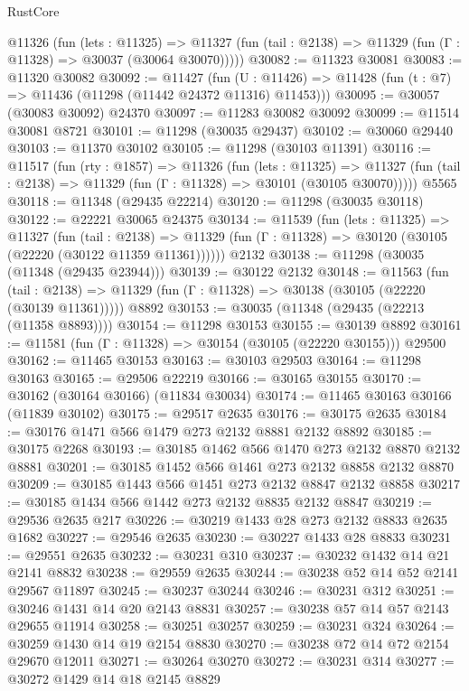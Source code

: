 \begin{lexlean}{RustCore}
\begin{coremodule}
    @11326
      (fun (lets : @11325) =>
      @11327 (fun (tail : @2138) => @11329 (fun (Γ : @11328) => @30037 (@30064 @30070)))))
@30082 := @11323 @30081
@30083 := @11320 @30082
@30092 := @11427
    (fun (U : @11426) => @11428 (fun (t : @7) => @11436 (@11298 (@11442 @24372 @11316) @11453)))
@30095 := @30057 (@30083 @30092) @24370
@30097 := @11283 @30082 @30092
@30099 := @11514 @30081 @8721
@30101 := @11298 (@30035 @29437)
@30102 := @30060 @29440
@30103 := @11370 @30102
@30105 := @11298 (@30103 @11391)
@30116 := @11517
    (fun (rty : @1857) =>
    @11326
      (fun (lets : @11325) =>
      @11327 (fun (tail : @2138) => @11329 (fun (Γ : @11328) => @30101 (@30105 @30070)))))
    @5565
@30118 := @11348 (@29435 @22214)
@30120 := @11298 (@30035 @30118)
@30122 := @22221 @30065 @24375
@30134 := @11539
    (fun (lets : @11325) =>
    @11327
      (fun (tail : @2138) =>
      @11329 (fun (Γ : @11328) => @30120 (@30105 (@22220 (@30122 @11359 @11361))))))
    @2132
@30138 := @11298 (@30035 (@11348 (@29435 @23944)))
@30139 := @30122 @2132
@30148 := @11563
    (fun (tail : @2138) => @11329 (fun (Γ : @11328) => @30138 (@30105 (@22220 (@30139 @11361)))))
    @8892
@30153 := @30035 (@11348 (@29435 (@22213 (@11358 @8893))))
@30154 := @11298 @30153
@30155 := @30139 @8892
@30161 := @11581 (fun (Γ : @11328) => @30154 (@30105 (@22220 @30155))) @29500
@30162 := @11465 @30153
@30163 := @30103 @29503
@30164 := @11298 @30163
@30165 := @29506 @22219
@30166 := @30165 @30155
@30170 := @30162 (@30164 @30166) (@11834 @30034)
@30174 := @11465 @30163 @30166 (@11839 @30102)
@30175 := @29517 @2635
@30176 := @30175 @2635
@30184 := @30176 @1471 @566 @1479 @273 @2132 @8881 @2132 @8892
@30185 := @30175 @2268
@30193 := @30185 @1462 @566 @1470 @273 @2132 @8870 @2132 @8881
@30201 := @30185 @1452 @566 @1461 @273 @2132 @8858 @2132 @8870
@30209 := @30185 @1443 @566 @1451 @273 @2132 @8847 @2132 @8858
@30217 := @30185 @1434 @566 @1442 @273 @2132 @8835 @2132 @8847
@30219 := @29536 @2635 @217
@30226 := @30219 @1433 @28 @273 @2132 @8833 @2635 @1682
@30227 := @29546 @2635
@30230 := @30227 @1433 @28 @8833
@30231 := @29551 @2635
@30232 := @30231 @310
@30237 := @30232 @1432 @14 @21 @2141 @8832
@30238 := @29559 @2635
@30244 := @30238 @52 @14 @52 @2141 @29567 @11897
@30245 := @30237 @30244
@30246 := @30231 @312
@30251 := @30246 @1431 @14 @20 @2143 @8831
@30257 := @30238 @57 @14 @57 @2143 @29655 @11914
@30258 := @30251 @30257
@30259 := @30231 @324
@30264 := @30259 @1430 @14 @19 @2154 @8830
@30270 := @30238 @72 @14 @72 @2154 @29670 @12011
@30271 := @30264 @30270
@30272 := @30231 @314
@30277 := @30272 @1429 @14 @18 @2145 @8829

\end{coremodule}
\end{lexlean}
